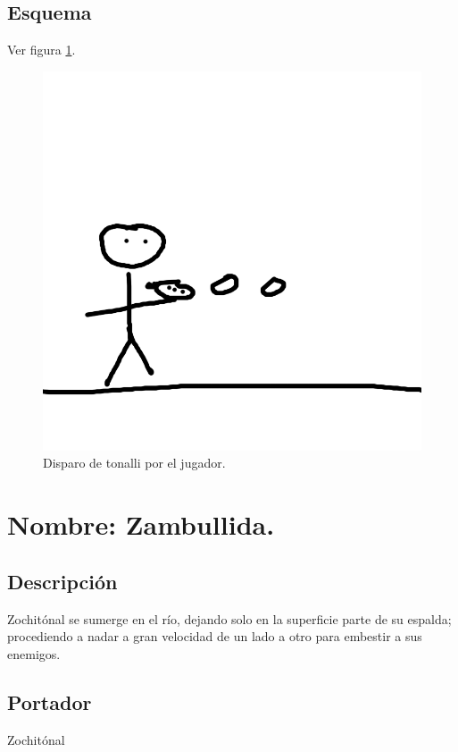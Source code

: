 \subsection{Esquema}
			Ver figura \ref{fig:disparoT}.
			\begin{figure}
				\centering
				\includegraphics[height=0.2 \textheight]{Imagenes/disparoT}
				\caption{Disparo de tonalli por el jugador.}
				\label{fig:disparoT}
			\end{figure}
			
\section{Nombre: Zambullida.}\label{hab.zambullida}
\subsection{Descripción}
Zochitónal se sumerge en el río, dejando solo en la superficie parte de su espalda; procediendo a nadar a gran velocidad de un lado a otro para embestir a sus enemigos.  
\subsection{Portador}
Zochitónal
